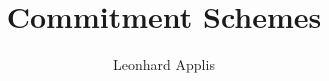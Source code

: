 \documentclass[conference]{IEEEtran}
\begin{document}
\title{Commitment Schemes}
\author{Leonhard Applis}

\maketitle






\end{document}
